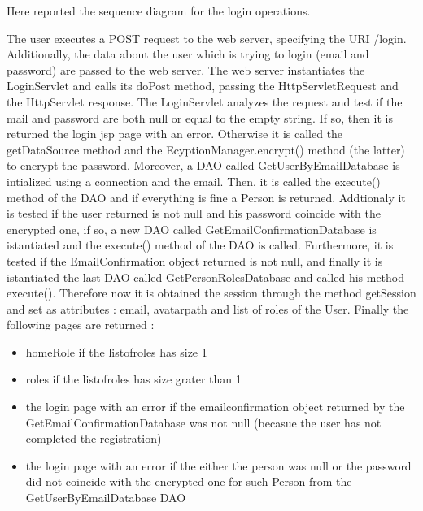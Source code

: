 \begin{flushleft}
Here reported the sequence diagram for the login operations. 

The user executes a POST request to the web server, specifying the URI /login. Additionally, the data about the user which is trying to login (email and password) are passed to the web server. The web server instantiates the LoginServlet and calls its doPost method, passing the HttpServletRequest and the HttpServlet response. The LoginServlet analyzes the request and test if the mail and password are both  null or equal to the empty string. If so, then it is returned the login jsp page with an error. Otherwise it is called the getDataSource method and the EcyptionManager.encrypt() method (the latter) to encrypt the password. Moreover, a DAO called GetUserByEmailDatabase is intialized using a connection and the email. Then, it is called the execute() method of the DAO and if everything is fine a Person is returned. Addtionaly it is tested if the user returned is not null and his password coincide with the encrypted one, if so, a new DAO called GetEmailConfirmationDatabase is istantiated and the execute() method of the DAO is called. Furthermore, it is tested if the EmailConfirmation object returned is not null, and finally it is istantiated the last DAO called GetPersonRolesDatabase and called his method execute().
Therefore now it is obtained the session through the method getSession and set as attributes : email, avatarpath and list of roles of the User.
Finally the following pages are returned :
\begin{itemize}
	\item homeRole if the listofroles has size 1
	\item roles if the listofroles has size grater than 1
	\item the login page with an error if the emailconfirmation object returned by the GetEmailConfirmationDatabase was not null (becasue the user has not completed the registration) 
	\item the login page with an error if the either the person was null or the password did not coincide with the encrypted one for such Person from the GetUserByEmailDatabase DAO
\end{itemize}

\end{flushleft}



